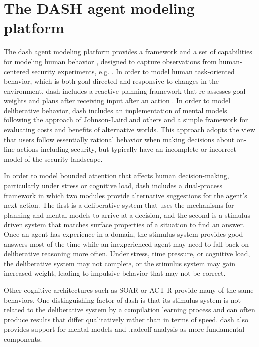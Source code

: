 \documentclass[conference]{IEEEtran}
\begin{document}
\section{The DASH agent modeling platform}
\label{dash}

The {\sc dash} agent modeling platform provides a framework 
and a set of capabilities for modeling human behavior 
\cite{blythe2012implementing}, designed to capture observations 
from human-centered security experiments, e.g. 
\cite{dhamija2006phishing}. In order to model human 
task-oriented behavior, which is both goal-directed and responsive 
to changes in the environment, {\sc dash} includes a reactive 
planning framework that re-assesses goal weights and plans after 
receiving input after an action \cite{bratman1987intention}. In 
order to model deliberative behavior, {\sc  dash} includes an 
implementation of mental models following the approach of 
Johnson-Laird and others \cite{johnson1986mental} and a simple 
framework for evaluating costs and benefits of alternative worlds. 
This approach adopts the view that users follow essentially rational behavior 
when making decisions about on-line actions including security, 
but typically have an incomplete or incorrect model of the security 
landscape. 

In order to model bounded attention that affects human 
decision-making, particularly under stress or cognitive load, 
{\sc dash} includes a dual-process framework 
\cite{stanovich2000advancing} in which two modules provide 
alternative suggestions for the agent's next action. The first is a 
deliberative system that uses the mechanisms for planning and 
mental models to arrive at a decision, and the second is a 
stimulus-driven system that matches surface properties of a 
situation to find an answer. Once an agent has experience in a 
domain, the stimulus system provides good answers most of the 
time while an inexperienced agent may need to fall back on 
deliberative reasoning more often. Under stress, time pressure, 
or cognitive load, the deliberative system may not complete, or 
the stimulus system may gain increased weight, leading to 
impulsive behavior that may not be correct.

Other cognitive architectures such as SOAR \cite{laird1987soar} or 
ACT-R \cite{anderson1993problem} provide many of the same 
behaviors. One distinguishing factor of {\sc dash} is that its stimulus 
system is not related to the deliberative system by a compilation 
learning process and can often produce results that differ 
qualitatively rather than in terms of speed. {\sc dash} also provides 
support for mental models and tradeoff analysis as more 
fundamental components.
\end{document}
